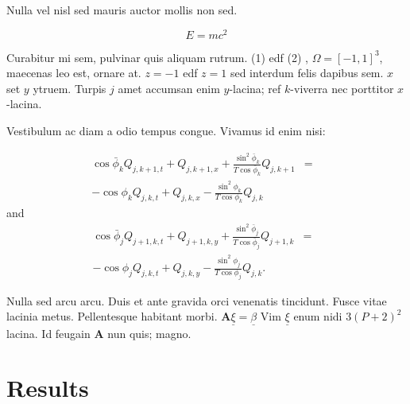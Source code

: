 \documentclass[a0,portrait]{a0poster}
\begin{document}
\begin{multicols}{2}
Nulla vel nisl sed mauris auctor mollis non sed. 

\begin{equation}
E = mc^{2}
\label{eqn:Einstein}
\end{equation}

Curabitur mi sem, pulvinar quis aliquam rutrum. (1) edf (2)
, $\Omega=[-1,1]^3$, maecenas leo est, ornare at. $z=-1$ edf $z=1$ sed interdum felis dapibus sem. $x$ set $y$ ytruem. 
Turpis $j$ amet accumsan enim $y$-lacina; 
ref $k$-viverra nec porttitor $x$-lacina. 

Vestibulum ac diam a odio tempus congue. Vivamus id enim nisi:

\begin{eqnarray}
\cos\bar{\phi}_k Q_{j,k+1,t} + Q_{j,k+1,x}+\frac{\sin^2\bar{\phi}_k}{T\cos\bar{\phi}_k} Q_{j,k+1} &=&\nonumber\\ 
-\cos\phi_k Q_{j,k,t} + Q_{j,k,x}-\frac{\sin^2\phi_k}{T\cos\phi_k} Q_{j,k}\label{edgek}
\end{eqnarray}
and
\begin{eqnarray}
\cos\bar{\phi}_j Q_{j+1,k,t} + Q_{j+1,k,y}+\frac{\sin^2\bar{\phi}_j}{T\cos\bar{\phi}_j} Q_{j+1,k}&=&\nonumber \\
-\cos\phi_j Q_{j,k,t} + Q_{j,k,y}-\frac{\sin^2\phi_j}{T\cos\phi_j} Q_{j,k}.\label{edgej}
\end{eqnarray} 

Nulla sed arcu arcu. Duis et ante gravida orci venenatis tincidunt. Fusce vitae lacinia metus. Pellentesque habitant morbi. $\mathbf{A}\underline{\xi}=\underline{\beta}$ Vim $\underline{\xi}$ enum nidi $3(P+2)^{2}$ lacina. Id feugain $\mathbf{A}$ nun quis; magno.


\section*{Results}


\end{multicols}
\end{document}
